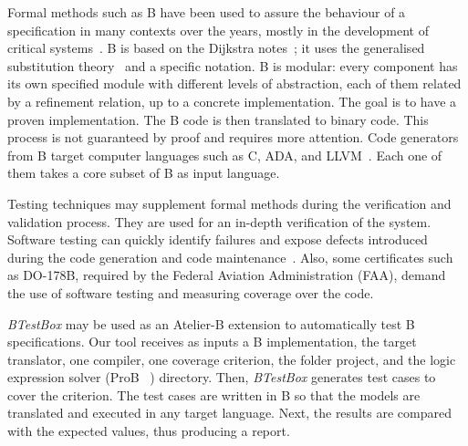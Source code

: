 \documentclass[runningheads]{llncs}
\begin{document}

Formal methods such as B have been used to assure the behaviour of a specification in many contexts over the years, mostly in the development of critical systems~\cite{leuschel:2005,valerio_thesis:2016}. 
B is based on the Dijkstra notes~\cite{dijkstra1976discipline}; it uses the generalised substitution theory~\cite{hoare2002proof} and a specific notation. 
B is modular:  every component has its own specified module with different levels of abstraction, each of them related by a refinement relation, up to a concrete implementation. 
The goal is to have a proven implementation. 
The B code is then translated to binary code.
This process is not guaranteed by proof and requires more attention. 
Code generators from B target computer languages such as C, ADA, and LLVM~\cite{deharbebtestbox}. 
Each one of them takes a core subset of B as input language. 




Testing techniques may supplement formal methods during the verification and validation process. 
They are used for an in-depth verification of the system. 
Software testing can quickly identify failures and expose defects introduced during the code generation and code maintenance~\cite{deharbebtestbox}. 
Also, some certificates such as DO-178B, required by the Federal Aviation Administration (FAA), demand the use of software testing and measuring coverage over the code.

 \textit{BTestBox} may be used as an Atelier-B extension to automatically test B specifications. 
Our tool receives as inputs a B implementation, the target translator, one compiler, one coverage criterion, the folder project, and the logic expression solver (ProB ~\cite{1_leuschel_2017}) %
directory. 
Then,  \textit{BTestBox} generates test cases to cover the criterion.
The test cases are written in B so that the models are translated and executed in any target language. 
Next, the results are compared with the expected values, thus producing a report. 
\end{document}
